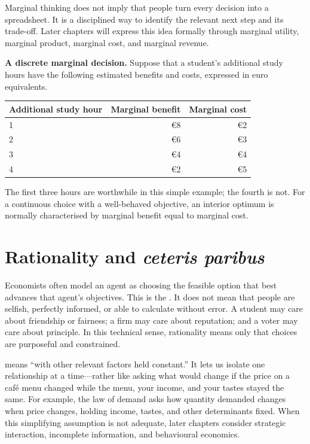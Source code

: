 Marginal thinking does not imply that people turn every decision into a
spreadsheet. It is a disciplined way to identify the relevant next step and
its trade-off. Later chapters will express this idea formally through
marginal utility, marginal product, marginal cost, and marginal revenue.

\begin{keyidea}
\textbf{A discrete marginal decision.} Suppose that a student's additional study hours have the following estimated benefits and costs, expressed in euro equivalents.
\begin{center}
\begin{tabular}{lrr}
\toprule
Additional study hour & Marginal benefit & Marginal cost \\
\midrule
1 & \euro8 & \euro2 \\
2 & \euro6 & \euro3 \\
3 & \euro4 & \euro4 \\
4 & \euro2 & \euro5 \\
\bottomrule
\end{tabular}
\end{center}
The first three hours are worthwhile in this simple example; the fourth is not. For a continuous choice with a well-behaved objective, an interior optimum is normally characterised by marginal benefit equal to marginal cost.
\end{keyidea}

\section{Rationality and \emph{ceteris paribus}}

Economists often model an agent as choosing the feasible option that best
advances that agent's objectives. This is the . It does not mean that people are selfish, perfectly informed, or
able to calculate without error. A student may care about friendship or
fairness; a firm may care about reputation; and a voter may care about
principle. In this technical sense, rationality means only that choices are
purposeful and constrained.

 means ``with other relevant factors held
constant.'' It lets us isolate one relationship at a time---rather like asking
what would change if the price on a café menu changed while the menu, your
income, and your tastes stayed the same. For example, the law of demand asks
how quantity demanded changes when price changes, holding income, tastes, and
other determinants fixed. When this simplifying assumption is not adequate,
later chapters consider strategic interaction, incomplete information, and
behavioural economics.

